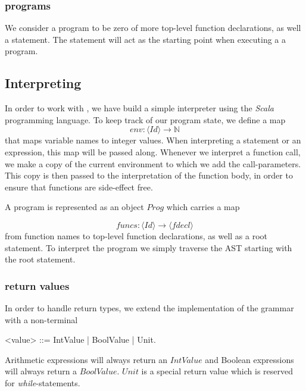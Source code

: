 \fi

\subsubsection{programs}

We consider a program to be zero of more top-level function declarations, as well a statement. The statement will act as the starting point when executing a a program. 

\subsection{Interpreting \simpl}

In order to work with \simpl, we have build a simple interpreter using the \emph{Scala} programming language. To keep track of our program state, we define a map
\begin{equation}
	env: \langle Id \rangle   \rightarrow \mathbb{N}
\end{equation}
that maps variable names to integer values. When interpreting a statement or an expression, this map will be passed along. Whenever we interpret a function call, we make a copy of the current environment to which we add the call-parameters. This copy is then passed to the interpretation of the function body, in order to ensure that functions are side-effect free. 

A program is represented as an object $Prog$ which carries a map

\begin{equation*}
	funcs: \langle Id \rangle \rightarrow \langle fdecl \rangle
\end{equation*}
from function names to top-level function declarations, as well as a root statement. To interpret the program we simply traverse the AST starting with the root statement. 


\subsubsection{return values}
In order to handle return types, we extend the implementation of the grammar with a non-terminal 

\begin{grammar}
	<value> ::= IntValue | BoolValue | Unit.
\end{grammar}

Arithmetic expressions will always return an $IntValue$ and Boolean expressions will always return a $BoolValue$. $Unit$ is a special return value which is reserved for \emph{while}-statements.


